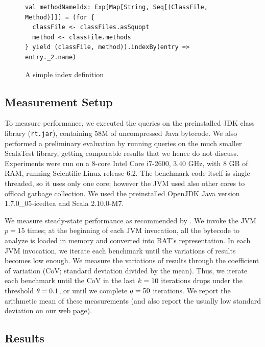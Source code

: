 \begin{figure}
\centering
\begin{lstlisting}
val methodNameIdx: Exp[Map[String, Seq[(ClassFile, Method)]]] = (for {
  classFile <- classFiles.asSquopt
  method <- classFile.methods
} yield (classFile, method)).indexBy(entry => entry._2.name)
\end{lstlisting}
\caption{A simple index definition}
\label{fig:indexes}
\end{figure}



\subsection{Measurement Setup}
To measure performance, we executed the queries on the preinstalled JDK class library (\texttt{rt.jar}), containing 58M of uncompressed Java bytecode.
We also performed a preliminary evaluation by running queries on the much smaller ScalaTest library, getting comparable results that we hence do not discuss.
Experiments were run on a 8-core Intel Core i7-2600, 3.40 GHz, with 8 GB of RAM, running Scientific Linux release 6.2.
The benchmark code itself is single-threaded, so it uses only one core; however the JVM used also other cores to offload garbage collection.
We used the preinstalled OpenJDK Java version 1.7.0\_05-icedtea and Scala 2.10.0-M7.

We measure steady-state performance as recommended by \citet{Georges07rigorousJavaPerformance}. We invoke the JVM $p = 15$ times;
at the beginning of each JVM invocation, all the bytecode to analyze is loaded in memory and converted into BAT's representation.
In each JVM invocation, we iterate each benchmark until the variations of results becomes low enough. We measure the variations of results through the coefficient of variation (CoV; standard deviation divided by the mean). Thus, we iterate each benchmark until the CoV in the last $k = 10$ iterations drops under the threshold $\theta = 0.1$, or until we complete $q = 50$ iterations.
We report the arithmetic mean of these measurements (and also report the usually low standard deviation on our web page).

\subsection{Results}


